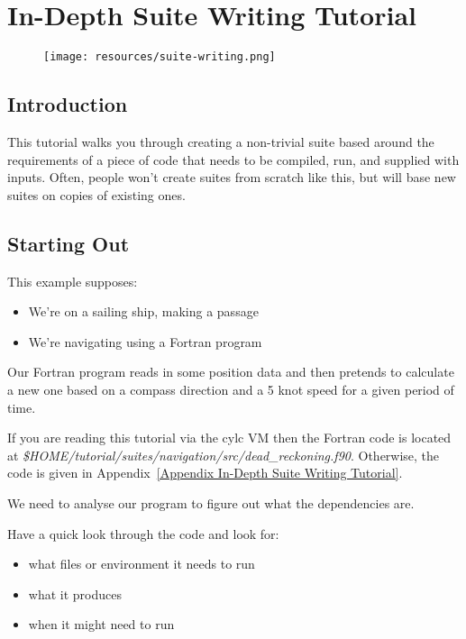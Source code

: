 
\section{In-Depth Suite Writing Tutorial}
\label{In-Depth Suite Writing Tutorial}

\begin{figure}[htp]
\texttt{[image: resources/suite-writing.png]}
\end{figure}

\subsection{Introduction}

This tutorial walks you through creating a non-trivial suite based around the requirements of a piece of code that needs to be compiled, run, and supplied with inputs. Often, people won't create suites from scratch like this, but will base new suites on copies of existing ones.

\subsection{Starting Out}

This example supposes:
\begin{itemize}
    \item We're on a sailing ship, making a passage
    \item We're navigating using a Fortran program
\end{itemize}

Our Fortran program reads in some position data and then pretends to calculate a new one based on a compass direction and a 5 knot speed for a given period of time.

If you are reading this tutorial via the cylc VM then the Fortran code is located at {\em \$HOME/tutorial/suites/navigation/src/dead\_reckoning.f90}. Otherwise, the code is given in Appendix~\ref{Appendix In-Depth Suite Writing Tutorial}.

We need to analyse our program to figure out what the dependencies are.

Have a quick look through the code and look for:
\begin{itemize}
    \item what files or environment it needs to run
    \item what it produces
    \item when it might need to run
\end{itemize}

